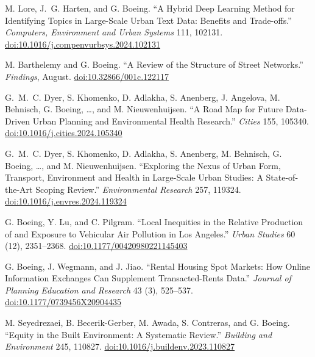 \documentclass[11pt,letterpaper]{report} %
\begin{document}
\begin{tablist}
\item[2024] \tab{}M. Lore, J.~G. Harten, and G. Boeing. \enquote{A Hybrid Deep Learning Method for Identifying Topics in Large-Scale Urban Text Data: Benefits and Trade-offs.} \textit{Computers, Environment and Urban Systems} 111, 102131. \href{https://doi.org/10.1016/j.compenvurbsys.2024.102131}{doi:10.1016/j.compenvurbsys.2024.102131}

\item[2024] \tab{}M. Barthelemy and G. Boeing. \enquote{A Review of the Structure of Street Networks.} \textit{Findings}, August. \href{https://doi.org/10.32866/001c.122117}{doi:10.32866/001c.122117}

\item[2024] \tab{}G.~M.~C. Dyer, S. Khomenko, D. Adlakha, S. Anenberg, J. Angelova, M. Behnisch, G. Boeing, \ldots, and M. Nieuwenhuijsen. \enquote{A Road Map for Future Data-Driven Urban Planning and Environmental Health Research.} \textit{Cities} 155, 105340. \href{https://doi.org/10.1016/j.cities.2024.105340}{doi:10.1016/j.cities.2024.105340}

\item[2024] \tab{}G.~M.~C. Dyer, S. Khomenko, D. Adlakha, S. Anenberg, M. Behnisch, G. Boeing, \ldots, and M. Nieuwenhuijsen. \enquote{Exploring the Nexus of Urban Form, Transport, Environment and Health in Large-Scale Urban Studies: A State-of-the-Art Scoping Review.} \textit{Environmental Research} 257, 119324. \href{https://doi.org/10.1016/j.envres.2024.119324}{doi:10.1016/j.envres.2024.119324}

\item[2023] \tab{}G. Boeing, Y. Lu, and C. Pilgram. \enquote{Local Inequities in the Relative Production of and Exposure to Vehicular Air Pollution in Los Angeles.} \textit{Urban Studies} 60 (12), 2351--2368. \href{https://doi.org/10.1177/00420980221145403}{doi:10.1177/00420980221145403}

\item[2023] \tab{}G. Boeing, J. Wegmann, and J. Jiao. \enquote{Rental Housing Spot Markets: How Online Information Exchanges Can Supplement Transacted-Rents Data.} \textit{Journal of Planning Education and Research} 43 (3), 525--537. \href{https://doi.org/10.1177/0739456X20904435}{doi:10.1177/0739456X20904435}

\item[2023] \tab{}M. Seyedrezaei, B. Becerik-Gerber, M. Awada, S. Contreras, and G. Boeing. \enquote{Equity in the Built Environment: A Systematic Review.} \textit{Building and Environment} 245, 110827. \href{https://doi.org/10.1016/j.buildenv.2023.110827}{doi:10.1016/j.buildenv.2023.110827}


\end{tablist}
\end{document}
